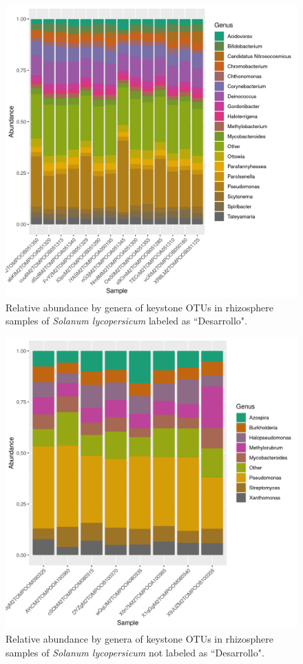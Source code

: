 \documentclass{article}
\begin{document}
\begin{figure}
    \centering
    \includegraphics[scale = 0.8]{tomate_desarrollo.csv_relative_abundance_Genus.png}
    \caption{Relative abundance by genera of keystone OTUs in rhizosphere samples of \textit{Solanum lycopersicum} labeled as ``Desarrollo".}
    \label{tomate_desarrollo_key_abundance_family}
\end{figure}


\begin{figure}
    \centering
    \includegraphics[scale = 0.8]{tomate_no_desarrollo.csv_relative_abundance_Genus.png}
    \caption{Relative abundance by genera of keystone OTUs in rhizosphere samples of \textit{Solanum lycopersicum} not labeled as ``Desarrollo".}
    \label{tomate_no_desarrollo_key_abundance_family}
\end{figure}
\end{document}
